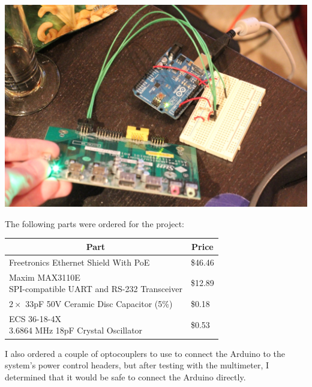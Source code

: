 \documentclass{amsart}
\begin{document}
\begin{center}
\includegraphics[width=.9\textwidth]{pled.jpg}
\end{center}

The following parts were ordered for the project:

\begin{center}
\begin{tabular}{|l|l|}
\hline
\multicolumn{1}{|c|}{\textbf{Part}} & \multicolumn{1}{|c|}{\textbf{Price}}\\
\hline
Freetronics Ethernet Shield With PoE & \$46.46\\
\hline
\pbox{5in}{Maxim MAX3110E\\SPI-compatible UART and RS-232 Transceiver} & \$12.89\\
\hline
$2\times$ 33pF 50V Ceramic Disc Capacitor (5\%) & \$0.18\\
\hline
\pbox{5in}{ECS 36-18-4X\\3.6864 MHz 18pF Crystal Oscillator} & \$0.53\\
\hline
\end{tabular}
\end{center}

I also ordered a couple of optocouplers to use to connect the Arduino to the system's power control headers, but after testing with the multimeter, I determined that it would be safe to connect the Arduino directly.
\end{document}
